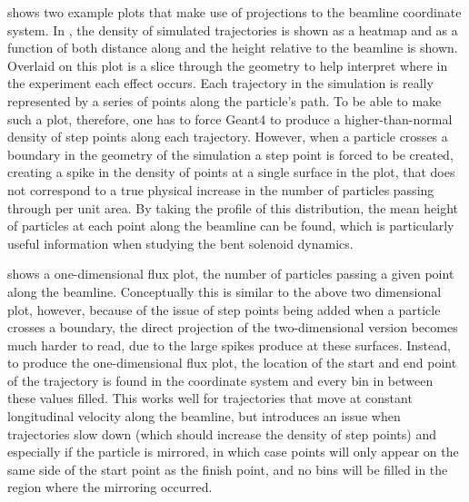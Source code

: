 \FigSoftwareBeamlineAnalysis

 shows two example plots that make use of projections to the beamline coordinate system.
In , the density of simulated trajectories is shown as a heatmap and as a function of both distance along and the height relative to the beamline is shown.
Overlaid on this plot is a slice through the geometry to help interpret where in the experiment each effect occurs.
Each trajectory in the simulation is really represented by a series of points along the particle's path.
To be able to make such a plot, therefore, one has to force Geant4 to produce a higher-than-normal density of step points along each trajectory.
However, when a particle crosses a boundary in the geometry of the simulation a step point is forced to be created, creating a spike in the density of points at a single surface in the plot, that does not correspond to a true physical increase in the number of particles passing through per unit area.
By taking the profile of this distribution, the mean height of particles at each point along the beamline can be found, which is particularly useful information when studying the bent solenoid dynamics.

 shows a one-dimensional flux plot, \ie the number of particles passing a given point along the beamline.
Conceptually this is similar to the above two dimensional plot, however, because of the issue of step points being added when a particle crosses a boundary, the direct projection of the two-dimensional version becomes much harder to read, due to the large spikes  produce at these surfaces.  
Instead, to produce the one-dimensional flux plot, the location of the start and end point of the trajectory is found in the coordinate system and every bin in between these values filled.
This works well for trajectories that move at constant longitudinal velocity along the beamline, but introduces an issue when trajectories slow down (which should increase the density of step points) and especially if the particle is mirrored, in which case points will only appear on the same side of the start point as the finish point, and no bins will be filled in the region where the mirroring occurred.

